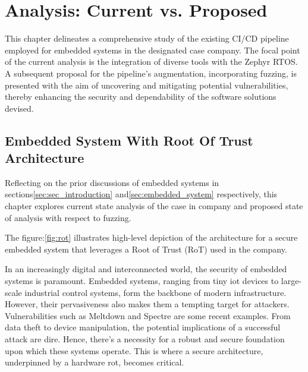 \vspace{21.5pt}
\chapter{Analysis: Current vs. Proposed}
This chapter delineates a comprehensive study of the existing CI/CD pipeline
employed for embedded systems in the designated case company.
The focal point of the current analysis is the integration of diverse tools
with the Zephyr RTOS. A subsequent proposal for the pipeline's augmentation,
incorporating fuzzing, is presented with the aim of uncovering and
mitigating potential vulnerabilities, thereby enhancing the security and
dependability of the software solutions devised.

\section{Embedded System With Root Of Trust Architecture}
Reflecting on the prior discussions of embedded systems in
sections\ref{sec:sec_introduction} and\ref{sec:embedded_system} respectively,
this chapter explores current state analysis of the case in company and proposed
state of analysis with respect to fuzzing.

The figure:\ref{fig:rot} illustrates high-level depiction of the architecture for a
secure embedded system that leverages a Root of Trust (RoT) used in the company.

In an increasingly digital and interconnected world, the security of
embedded systems is paramount. Embedded systems, ranging from tiny
\gls{iot} devices to large-scale industrial control
systems, form the backbone of modern infrastructure. However,
their pervasiveness also makes them a tempting target for attackers. Vulnerabilities such as
Meltdown\cite{lipp2020meltdown} and Spectre\cite{kocher2020spectre} are some recent examples.
From data theft to device manipulation, the potential implications of
a successful attack are dire. Hence, there's a necessity for a robust
and secure foundation upon which these systems operate. This is where a secure architecture,
underpinned by a hardware \gls{rot}, becomes critical\cite{Introduc7:online}.


